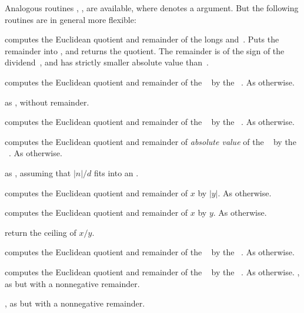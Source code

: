 \noindent Analogous routines , ,
 are available, where  denotes a 
argument. But the following routines are in general more flexible:

 computes the Euclidean
quotient and remainder of the longs  and~. Puts the remainder
into , and returns the quotient. The remainder is of the sign of the
dividend~, and has strictly smaller absolute value than~.

 computes the Euclidean
quotient and remainder of the ~ by the ~. As
 otherwise.

 as , without
remainder.

 computes the Euclidean quotient
and remainder of the ~ by the ~. As
 otherwise.

 computes the Euclidean quotient
and remainder of \emph{absolute value} of the ~ by the
~. As  otherwise.

 as , assuming
that $|n|/d$ fits into an .

computes the Euclidean quotient and remainder of $x$ by $|y|$. As
 otherwise.

computes the Euclidean quotient and remainder of $x$ by $y$. As
 otherwise.

 return the ceiling of $x / y$.

 computes the Euclidean quotient
and remainder of the ~ by the ~. As
 otherwise.

 computes the Euclidean quotient
and remainder of the ~ by the ~. As
 otherwise.
\smallskip
{}, as  but with a
nonnegative remainder.

, as  but with a
nonnegative remainder.

